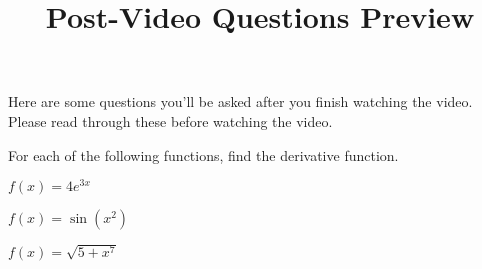 \documentclass[handout]{ximera}
\title{Post-Video Questions Preview}
\begin{document}
\begin{abstract}
\end{abstract}


\maketitle

Here are some questions you’ll be asked after you finish watching the video. Please read through these before watching the video.

For each of the following functions, find the derivative function.

\begin{problem}
$f(x)=4e^{3x}$
\end{problem}

\begin{problem}
$f(x)=\sin(x^2)$
\end{problem}

\begin{problem}
$f(x)=\sqrt{5+x^7}$
\end{problem}
\end{document}
